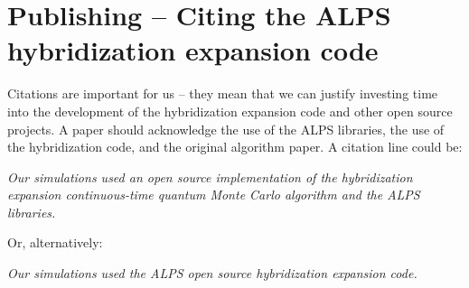 \documentclass[aps,prb,floatfix,superscriptaddress,twocolumn,notitlepage]{revtex4-1}
\begin{document}
\section{Publishing -- Citing the ALPS hybridization expansion code}
Citations are important for us -- they mean that we can justify investing time into the development of the hybridization expansion code and other open source projects. A paper should acknowledge the use of the ALPS libraries, the use of the hybridization code, and the original algorithm paper. A citation line could be:

{\it
Our simulations used an open source implementation\cite{CPC_CTHYB} of the hybridization expansion continuous-time quantum Monte Carlo algorithm\cite{Werner06} and the ALPS\cite{ALPS20} libraries.
}

Or, alternatively:

{\it
Our simulations used the ALPS open source hybridization expansion code\cite{CPC_CTHYB,Werner06,ALPS20}.
}




\end{document}
